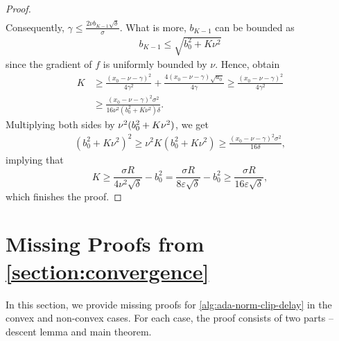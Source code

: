 \documentclass{article}
\begin{document}
\begin{proof}
\begin{align*}
    \end{align*}
    Consequently, $\gamma \leq \frac{2\nu b_{K-1}\sqrt{\delta}}{\sigma}$. What is more, $b_{K-1}$ can be bounded as 
    \begin{align*}
        b_{K-1} \leq \sqrt{b_0^2 + K\nu^2}
    \end{align*}
    since the gradient of $f$ is uniformly bounded by $\nu$. Hence,  obtain
    \begin{align*}
        K &\geq \frac{(x_0 - \nu - \gamma)^2}{4\gamma^2} + \frac{4(x_0 - \nu - \gamma)\sqrt{a_0}}{4\gamma} \geq \frac{(x_0 - \nu - \gamma)^2}{4\gamma^2} \\
        &\geq \frac{(x_0 - \nu - \gamma)^2\sigma^2}{16\nu^2 (b_0^2 + K\nu^2)\delta}.
    \end{align*}
    Multiplying both sides by ${\color{black}\nu^2}(b_0^2 + K\nu^2)$, we get
    \begin{align*}
        (b_0^2 + K\nu^2)^2 \geq \nu^2K(b_0^2 + K\nu^2) \geq \frac{(x_0 - \nu - \gamma)^2\sigma^2}{16\delta},
    \end{align*}
    implying that
    \begin{equation*}
        K \geq \frac{\sigma R}{4\nu^2\sqrt{\delta}} - b_0^2 = \frac{\sigma R}{8\varepsilon\sqrt{\delta}} - b_0^2 \geq \frac{\sigma R}{16\varepsilon\sqrt{\delta}},
    \end{equation*}
    which finishes the proof.
    
\end{proof}



\newpage


\section{Missing Proofs from \cref{section:convergence}}
\label{appendix:proofs-convergence}
In this section, we provide missing proofs for \cref{alg:ada-norm-clip-delay} in the convex and non-convex cases. For each case, the proof consists of two parts -- descent lemma and main theorem. 
\end{document}
